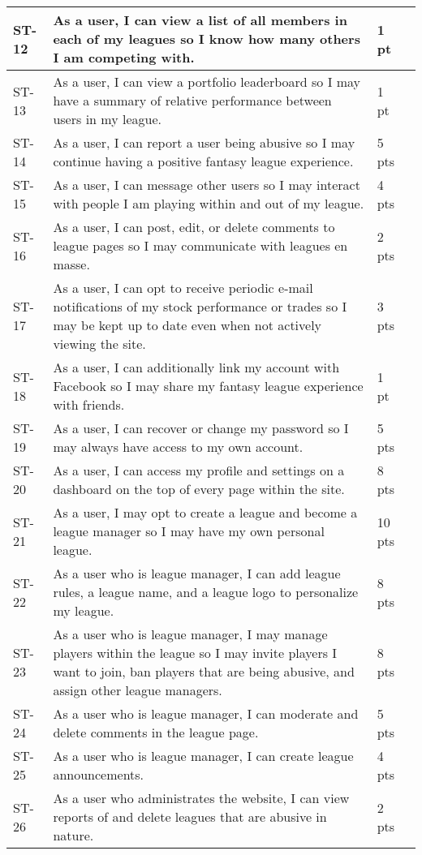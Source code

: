 \begin{longtable}{|p{0.5in}|p{4.7in}|p{0.5in}|}
ST-12&As a user, I can view a list of all members in each of my leagues so I know how many others I am competing with.&1 pt   \\ \hline 
ST-13&As a user, I can view a portfolio leaderboard so I may have a summary of relative performance between users in my league.&1 pt   \\ \hline 
ST-14&As a user, I can report a user being abusive so I may continue having a positive fantasy league experience.&5 pts  \\ \hline 
ST-15&As a user, I can message other users so I may interact with people I am playing within and out of my league.&4 pts  \\ \hline 
ST-16&As a user, I can post, edit, or delete comments to league pages so I may communicate with leagues en masse.&2 pts  \\ \hline 
ST-17&As a user, I can opt to receive periodic e-mail notifications of my stock performance or trades so I may be kept up to date even when not actively viewing the site.&3 pts  \\ \hline 
ST-18&As a user, I can additionally link my account with Facebook so I may share my fantasy league experience with friends.&1 pt   \\ \hline 
ST-19&As a user, I can recover or change my password so I may always have access to my own account.&5 pts  \\ \hline 
ST-20&As a user, I can access my profile and settings on a dashboard on the top of every page within the site.&8 pts  \\ \hline 
ST-21&As a user, I may opt to create a league and become a league manager so I may have my own personal league.&10 pts \\ \hline 
ST-22&As a user who is league manager, I can add league rules, a league name, and a league logo to personalize my league.&8 pts  \\ \hline 
ST-23&As a user who is league manager, I may manage players within the league so I may invite players I want to join, ban players that are being abusive, and assign other league managers.&8 pts  \\ \hline 
ST-24&As a user who is league manager, I can moderate and delete comments in the league page.&5 pts  \\ \hline 
ST-25&As a user who is league manager, I can create league announcements.&4 pts  \\ \hline 
ST-26&As a user who administrates the website, I can view reports of and delete leagues that are abusive in nature.&2 pts  \\ \hline 

\end{longtable}
